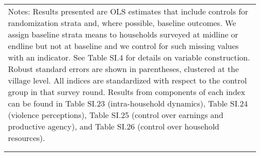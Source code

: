 \begin{longtable}{llcccccccccc}
\multicolumn{12}{p{\textwidth}}{{Notes: Results presented are OLS estimates that include controls for randomization strata and, where possible, baseline outcomes. We assign baseline strata means to households surveyed at midline or endline but not at baseline and we control for such missing values with an indicator. See Table SI.4 for details on variable construction. Robust standard errors are shown in parentheses, clustered at the village level. All indices are standardized with respect to the control group in that survey round. Results from components of each index can be found in Table SI.23 (intra-household dynamics), Table SI.24 (violence perceptions), Table SI.25 (control over earnings and productive agency), and Table SI.26 (control over household resources).}} \\                                                                                                    
\multicolumn{12}{p{\textwidth}}{{}} \\                                                                                                                                                                                                                                                                                                                                                                                                                                                                                                                                                                                                                                                                                                                                                                                                                                                                            
\endlastfoot                                                                                                                                                                                                                                                                                                                                                                                                                                                                                                                                                                                                                                                                                                                                                                                                                                                                                                      

\end{longtable}
